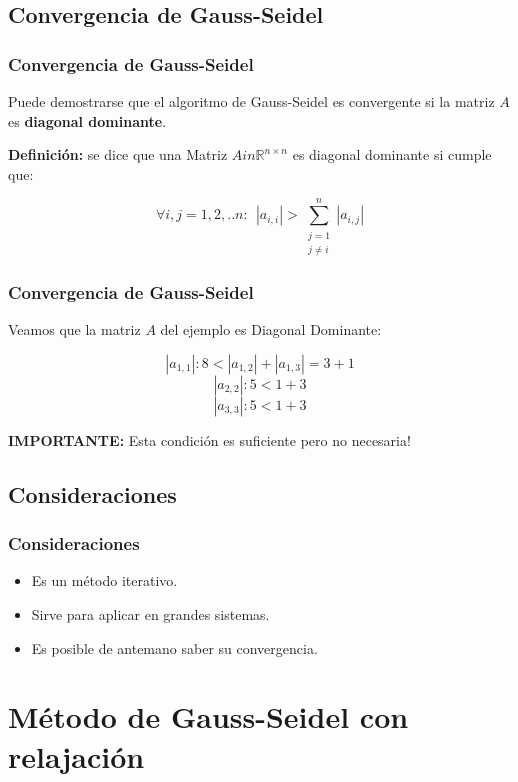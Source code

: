 \documentclass[xcolor=svgnames]{beamer} %
\theoremstyle{plain}
\renewcommand{\textbf}[1]{{\bfseries\textcolor{redUnq2}{#1}}}
\theoremstyle{definition}
\begin{document}
\subsection{Convergencia de Gauss-Seidel}
\begin{frame}
\frametitle{Convergencia de Gauss-Seidel}

Puede demostrarse que el algoritmo de Gauss-Seidel es convergente si la matriz $A$ es  \textbf{diagonal dominante}.

\pause
\begin{tcolorbox}
\textbf{Definición:} se dice que una Matriz $A in \mathbb{R}^{n\times n}$ es diagonal dominante si cumple que:

$$\forall i,j=1,2,..n :\ \  |a_{i,i}| > \sum_{\substack{j=1 \\j\neq i}}^n  |a_{i,j} |$$
\end{tcolorbox}

\end{frame}

\begin{frame}
\frametitle{Convergencia de Gauss-Seidel}
Veamos que la matriz $A$ del ejemplo es Diagonal Dominante:

$$ |a_{1,1}| : 8 < |a_{1,2}| + |a_{1,3}| = 3 +1 $$
$$ |a_{2,2}| : 5 < 1 + 3 $$
$$ |a_{3,3}| : 5 < 1 + 3 $$

\pause
\begin{tcolorbox}
\textbf{IMPORTANTE:}
 Esta condición es suficiente pero no necesaria!
\end{tcolorbox}

\end{frame}

\subsection{Consideraciones}

\begin{frame}
\frametitle{Consideraciones}

\begin{itemize}
\item Es un método iterativo.
\item Sirve para aplicar en grandes sistemas.
\item Es posible de antemano saber su convergencia.
\end{itemize}
\end{frame}


\section{Método de Gauss-Seidel con relajación}
\end{document}
